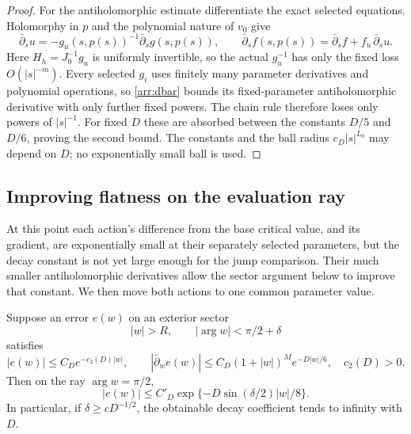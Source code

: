 \begin{proof}
For the antiholomorphic estimate differentiate the exact
selected equations.  Holomorphy in \(p\) and the polynomial
nature of \(v_0\) give
\begin{equation}\label{arr:antiholomorphic-chain}
 \bar\partial_s u
    =-g_u(s,p(s))^{-1}\bar\partial_sg(s,p(s)),\qquad
 \bar\partial_s f(s,p(s))
    =\bar\partial_sf+f_u\,\bar\partial_su .
\end{equation}
Here \(H_h=J_0^{-1}g_u\) is uniformly invertible, so the
actual \(g_u^{-1}\) has only the fixed loss
\(O(|s|^{-m})\).
Every selected \(g_i\) uses finitely many parameter
derivatives and polynomial operations, so
\eqref{arr:dbar} bounds its fixed-parameter
antiholomorphic derivative with only further fixed powers.
The chain rule therefore loses only powers of \(|s|^{-1}\).
For fixed \(D\) these are absorbed between the constants
\(D/5\) and \(D/6\), proving the second bound.
The constants and the ball radius \(c_D|s|^{L_0}\) may
depend on \(D\); no exponentially small ball is used.
\end{proof}

\subsection{Improving flatness on the evaluation ray}

At this point each action's difference from the base critical value,
and its gradient, are exponentially small at their separately selected
parameters, but the decay constant is not yet
large enough for the jump comparison.  Their much smaller
antiholomorphic derivatives allow the sector argument below to improve
that constant.  We then move both actions to one common parameter value.

\begin{lemma}
\label{arr:flatness-upgrade}
Suppose an error \(e(w)\) on an exterior sector
\[
 |w|>R,\qquad |\arg w|<\pi/2+\delta
\]
satisfies
\[
 |e(w)|\le C_D e^{-c_2(D)|w|},\qquad
 |\bar\partial_we(w)|\le C_D(1+|w|)^M e^{-D|w|/6},
 \quad c_2(D)>0.
\]
Then on the ray \(\arg w=\pi/2\),
\begin{equation}\label{arr:improved-exponent}
 |e(w)|\le C'_D
       \exp\{-D\sin(\delta/2)|w|/8\}.
\end{equation}
In particular, if \(\delta\ge cD^{-1/2}\), the obtainable
decay coefficient tends to infinity with \(D\).
\end{lemma}

